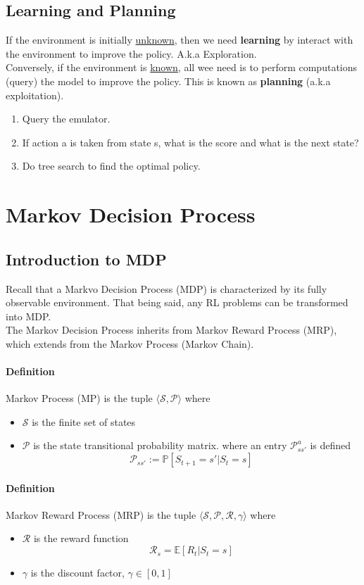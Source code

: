 \documentclass{article}
\begin{document}
	\subsection{Learning and Planning}
	If the environment is initially \underline{unknown}, then we need \textbf{learning} by interact with the environment to improve the policy. A.k.a Exploration.\\ 
	Conversely, if the environment is \underline{known}, all wee need is to perform computations (query) the model to improve the policy. This is known as \textbf{planning} (a.k.a exploitation). 
	\begin{enumerate}
		\item Query the emulator.
		\item If action a is taken from state s, what is the score and what is the next state? 
		\item Do tree search to find the optimal policy.
	\end{enumerate}

	
	\section{Markov Decision Process}
	\subsection{Introduction to MDP}
	Recall that a Markvo Decision Process (MDP) is characterized by its fully observable environment. That being said, any RL problems can be transformed into MDP. \\
	The Markov Decision Process inherits from Markov Reward Process (MRP), which extends from the Markov Process (Markov Chain). 
	\paragraph{Definition} Markov Process (MP) is the tuple $ \langle \mathcal{S, P} \rangle $ where 
	\begin{itemize}
		\item $\mathcal{S}$ is the finite set of states
		\item $\mathcal{P}$ is the state transitional probability matrix. where an entry $\mathcal{P}^a_{ss'}$ is defined
		\begin{equation*}
		\mathcal{P}_{ss'} := \mathbb{P}[S_{t+1} = s' | S_t = s] 
		\end{equation*}
	\end{itemize}
	
	\paragraph{Definition} Markov Reward Process (MRP) is the tuple $ \langle \mathcal{S, P, R, \gamma} \rangle$ where 
	\begin{itemize}
		\item $\mathcal{R}$ is the reward function 
		\begin{equation*}
		\mathcal{R}_s = \mathbb{E}[R_t | S_t = s]
		\end{equation*}
		\item $\gamma$ is the discount factor, $\gamma \in [0,1]$
	\end{itemize}
	
\end{document}
